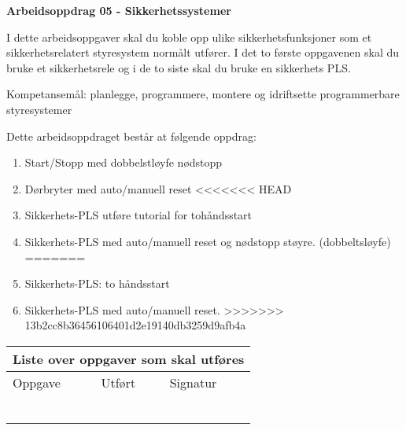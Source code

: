 
\noindent
{\bf Arbeidsoppdrag 05 - Sikkerhetssystemer}

\vskip 5pt

I dette arbeidsoppgaver skal du koble opp ulike sikkerhetsfunksjoner som et sikkerhetsrelatert styresystem normålt utfører. I det to første oppgavenen skal du bruke et sikkerhetsrele og i de to siste skal du bruke en sikkerhets PLS. 

Kompetansemål:
planlegge, programmere, montere og idriftsette programmerbare styresystemer

Dette arbeidsoppdraget består at følgende oppdrag:
\begin{enumerate}
	\item Start/Stopp med dobbelstløyfe nødstopp
	\item Dørbryter med auto/manuell reset
<<<<<<< HEAD
	\item Sikkerhets-PLS utføre tutorial for tohåndsstart	 
	\item Sikkerhets-PLS med auto/manuell reset og nødstopp støyre. (dobbeltsløyfe) 
=======
	\item Sikkerhets-PLS: to håndsstart
	\item Sikkerhets-PLS med auto/manuell reset. 
>>>>>>> 13b2cc8b36456106401d2e19140db3259d9afb4a
\end{enumerate}

\begin{center}
\begin{tabular}{ | m{8cm} | m{1cm}| m{2cm} | } 
\hline
\multicolumn{3}{|c|}{Liste over oppgaver som skal utføres} \\
	\hline
	Oppgave	& Utført & Signatur \\ 
	\hline
	\hline
	& & \\ 
	\hline
	& & \\ 
	\hline
	& & \\ 
	\hline
	& & \\ 
	\hline
	& & \\ 
	\hline
	& & \\ 
	\hline
\end{tabular}
\end{center}


